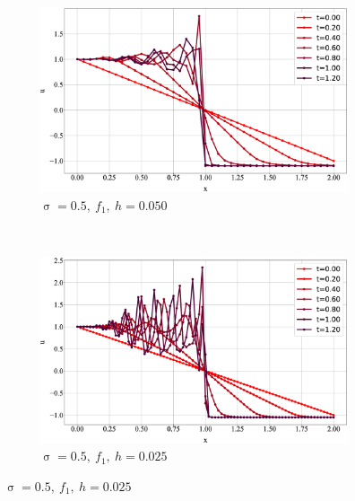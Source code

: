 \documentclass[a4paper,12pt]{article}
\DeclareMathOperator{\cour}{\sigma}
\begin{document}
  \iffalse
  \begin{figure}[p]
    \begin{subfigure}[t]{0.5\textwidth}
      \caption*{$\cour = 0.5,\ f_1,\ h = 0.050$}
      \includegraphics[width=\linewidth]{5.maccormack.cour05.f1050}
    \end{subfigure}
    ~
    \begin{subfigure}[t]{0.5\textwidth}
      \caption*{$\cour = 0.5,\ f_1,\ h = 0.025$}
      \includegraphics[width=\linewidth]{5.maccormack.cour05.f1025}
    \end{subfigure}
    

\end{figure}
\end{document}
